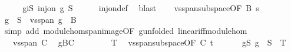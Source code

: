 \begin{isabellebody}
\isanewline
\ \ \isamarkupfalse%
\ \isamarkupfalse%
\ giS{\isacharcolon}{\kern0pt}\ {\isachardoublequoteopen}inj{\isacharunderscore}{\kern0pt}on\ g\ S{\isachardoublequoteclose}\isanewline
\ \ \ \ \isamarkupfalse%
\ inj{\isacharunderscore}{\kern0pt}on{\isacharunderscore}{\kern0pt}def\ \isamarkupfalse%
\ blast\isanewline
\ \ \isamarkupfalse%
\ vs{}{\isachardot}{\kern0pt}span{\isacharunderscore}{\kern0pt}subspace{\isacharbrackleft}{\kern0pt}OF\ B{\isacharparenleft}{\kern0pt}{}{\isacharcomma}{\kern0pt}{}{\isacharparenright}{\kern0pt}\ s{\isacharbrackright}{\kern0pt}\ \isamarkupfalse%
\ {\isachardoublequoteopen}g\ {\isacharbackquote}{\kern0pt}\ S\ {\isacharequal}{\kern0pt}\ vs{}{\isachardot}{\kern0pt}span\ {\isacharparenleft}{\kern0pt}g\ {\isacharbackquote}{\kern0pt}\ B{\isacharparenright}{\kern0pt}{\isachardoublequoteclose}\isanewline
\ \ \ \ \isamarkupfalse%
\ {\isacharparenleft}{\kern0pt}simp\ add{\isacharcolon}{\kern0pt}\ module{\isacharunderscore}{\kern0pt}hom{\isachardot}{\kern0pt}span{\isacharunderscore}{\kern0pt}image{\isacharbrackleft}{\kern0pt}OF\ g{\isacharparenleft}{\kern0pt}{}{\isacharparenright}{\kern0pt}{\isacharbrackleft}{\kern0pt}unfolded\ linear{\isacharunderscore}{\kern0pt}iff{\isacharunderscore}{\kern0pt}module{\isacharunderscore}{\kern0pt}hom{\isacharbrackright}{\kern0pt}{\isacharbrackright}{\kern0pt}{\isacharparenright}{\kern0pt}\isanewline
\ \ \isamarkupfalse%
\ \isamarkupfalse%
\ {\isachardoublequoteopen}{\isasymdots}\ {\isacharequal}{\kern0pt}\ vs{}{\isachardot}{\kern0pt}span\ C{\isachardoublequoteclose}\ \isamarkupfalse%
\ gBC\ \isacommand{{\isachardot}{\kern0pt}{\isachardot}{\kern0pt}}\isamarkupfalse%
\isanewline
\ \ \isamarkupfalse%
\ \isamarkupfalse%
\ {\isachardoublequoteopen}{\isasymdots}\ {\isacharequal}{\kern0pt}\ T{\isachardoublequoteclose}\ \isamarkupfalse%
\ vs{}{\isachardot}{\kern0pt}span{\isacharunderscore}{\kern0pt}subspace{\isacharbrackleft}{\kern0pt}OF\ C{\isacharparenleft}{\kern0pt}{}{\isacharcomma}{\kern0pt}{}{\isacharparenright}{\kern0pt}\ t{\isacharbrackright}{\kern0pt}\ \isacommand{{\isachardot}{\kern0pt}}\isamarkupfalse%
\isanewline
\ \ \isamarkupfalse%
\ \isamarkupfalse%
\ gS{\isacharcolon}{\kern0pt}\ {\isachardoublequoteopen}g\ {\isacharbackquote}{\kern0pt}\ S\ {\isacharequal}{\kern0pt}\ T{\isachardoublequoteclose}\ \isacommand{{\isachardot}{\kern0pt}}\isamarkupfalse%

\end{isabellebody}
